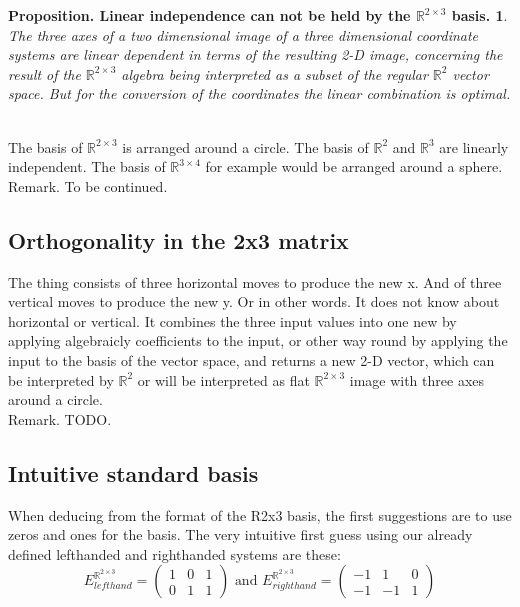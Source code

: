 \documentclass[a4paper]{article}
\begin{document}
\newtheorem{PropositionE}{Proposition. Linear independence can not be held by the $\mathbb{R}^{2\times3}$ basis.}
\begin{PropositionE}
The three axes of a two dimensional image of a three dimensional coordinate systems are linear dependent in terms of
the resulting 2-D image, concerning the result of the $\mathbb{R}^{2\times3}$ algebra being interpreted as a subset 
of the regular $\mathbb{R}^{2}$ vector space. But for the conversion of the coordinates the linear combination is optimal.
\end{PropositionE}\\

The basis of $\mathbb{R}^{2\times3}$ is arranged around a circle. The basis of $\mathbb{R}^{2}$ and $\mathbb{R}^{3}$ are linearly independent. The basis of $\mathbb{R}^{3\times4}$ for example would be arranged around a sphere.\\

Remark. To be continued.

\subsection{Orthogonality in the 2x3 matrix}

The thing consists of three horizontal moves to produce the new x. And of three vertical moves to produce the new y. Or in other words. It does not know about horizontal or vertical. It combines the three input values into one new by applying algebraicly coefficients to the input, or other way round by applying the input to the basis of the vector space, and returns a new 2-D vector, which can be interpreted by $\mathbb{R}^{2}$ or will be interpreted as flat $\mathbb{R}^{2\times3}$ image with three axes around a circle.\\

Remark. TODO.

\subsection{Intuitive standard basis}

When deducing from the format of the R2x3 basis, the first suggestions are to use zeros and ones for the basis. The very intuitive first guess using our already defined lefthanded and righthanded systems are these:\\

\begin{displaymath}
    E^{\mathbb{R}^{2\times{3}}}_{lefthand} = \begin{pmatrix}1&0&1\\0&1&1\end{pmatrix} \mbox{ and }
    E^{\mathbb{R}^{2\times{3}}}_{righthand} = \begin{pmatrix}-1&1&0\\-1&-1&1\end{pmatrix}
\end{displaymath}
\end{document}
